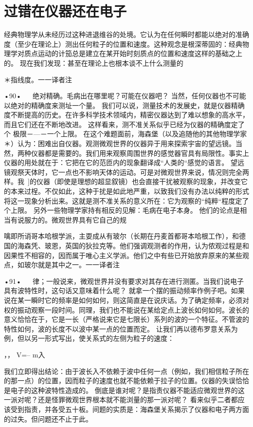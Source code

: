\section{过错在仪器还在电子}

经典物理学从未经历过这种进退维谷的处境。它认为在任何瞬时都能以绝对的准确度（至少在理论上）测出任何粒子的位置和速度。这种观念是根深蒂固的：经典物理学对质点运动的计笳总是建立在某开始时刻质点的位置和速度这样的基础之上的。
现在我们发现：甚至在理论上也根本谈不上什么测量的

＊指线度。一一译者注

•90•
  
绝对精确。毛病出在哪里呢？可能在仪器吧？
当然，任何仪器也不可能以绝对的精确度来测址一个量。
我们可以说，测量技术的发展史，就是仪器精确度不断提高的历史。在许多科学技术领域内，精密仪器达到了难以想象的高水平，而且它们还在不断地改进。
这样看来，测不准关系似乎已经为仪器的精确度定了个
极限－—－一个上限。
在这个难题面前，海森堡（以及追随他的其他物理学家＊）认为：困难出自仪器。观测微观世界的仪器异于用来探索宇宙的望远镜。当然，两种仪器都是需要的。我们用来观察周围世界的感觉器官具有局限性。事实上仪器的用处就在于：它把在它的范匝内的现象翻译成“人类的“感觉的语言。
望远镜观祭天体时，它一点也不影响天体的运动。可是对微观世界来说，情况则完全两样。我~]的仪器（即使是理想的超显叙镜）也会直接干扰被观察的现象，并改变它的本来过桯。不仅如此，这种于扰是如此地严重，以致我们没有办法以纯粹的形式将这一现象分析出来。这就是测不准关系的意义所在：它为观察的“纯粹“程度定了个上限。
另外一些物理学家持有相反的见解：毛病在电子本身。
他们的论点是相当有说服力的。微观世界具有它自己的规

噙即所诮哥本哈根学派，主耍成从有玻尔（长期在丹麦首都哥本哈根工作），和德国的海森凭、玻恩，英国的狄拉克等。他们强调观测者的作用，认为侬观过程是和因果性不相容的，因而属于唯心主义学派。他们之中有些已开始放弃原来的某些观点，如玻尔就是其中之一。一一译者注

•91•
  
律；一般说来，微观世界并没有要求对其存在进行测匿。当我们说电子具有波特性时，这句话又意味着什么呢？
就拿一个摆的振动频率作例子吧。如果说在某一瞬时它的频率是如何如何，则这简直是在说庆话。为了确定频率，必须对权的振动观察一段时间。同理，我们也不能说在某给定点上波长如何如何。波长的意义恰恰在于，它是一长（严格说来它是七限长）系列的波的一个特征。不管波的特性如何，波的长度不以波中某一点的位置而定。
让我们再以德布罗意关系为例，但以另一形式写出，使关系式的左侧为粒子的速度：

，，
V=--
m入

我们立即得出结论：由于波长入不依赖于波中任何一点（例如，我们相信粒子所在的那一点）的位置，因而粒子的速度也就不能依赖于拉子的位置。仪器的失误恰恰是电子的这种波特性造成的。
倒底是谁对呢？是指责仪器不能适应微观世界的这一派对呢？还是怪罪微观世界根本就不能浏量的那一派对呢？
看来似乎二者都应该受到指责，并各受五十板。间题的实质是：海森堡关系揭示了仪器和电子两方面的过失。但问题还不止于此。

